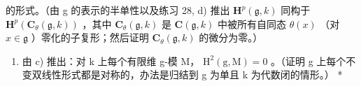 的形式。（由 g 的表示的半单性以及练习 28, d) 推出 \(\mathbf{H}^p(\mathfrak{g}, k)\) 同构于 \(\mathbf{H}^p(\mathbf{C}_{\theta}(\mathfrak{g}, k))\) ，其中 \(\mathbf{C}_{\theta}(\mathfrak{g}, k)\) 是 \(\mathbf{C}(\mathfrak{g}, k)\) 中被所有自同态 \(\theta(x)\) （对 \(x \in \mathfrak{g}\) ）零化的子复形；然后证明 \(\mathbf{C}_{\theta}(\mathfrak{g}, k)\) 的微分为零。）

\begin{enumerate}
\def\labelenumi{\alph{enumi})}
\setcounter{enumi}{3}
\tightlist
\item
  由 c) 推出：对 k 上每个有限维 g-模 M， \(\mathrm{H}^{2}(\mathrm{g},\mathrm{M})=0\) 。（证明 g 上每个不变双线性形式都是对称的，办法是归结到 g 为单且 k 为代数闭的情形。） *
\end{enumerate}
\relax{}

